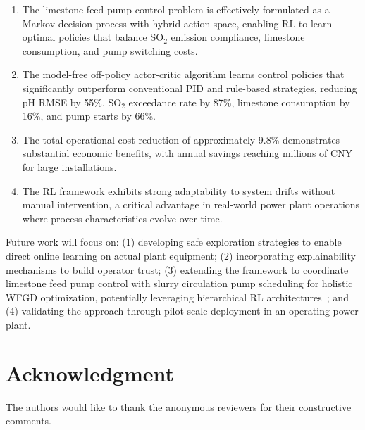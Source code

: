 \documentclass[journal]{IEEEtran}
\begin{document}
\begin{enumerate}
\item The limestone feed pump control problem is effectively formulated as a Markov decision process with hybrid action space, enabling RL to learn optimal policies that balance SO$_2$ emission compliance, limestone consumption, and pump switching costs.

\item The model-free off-policy actor-critic algorithm learns control policies that significantly outperform conventional PID and rule-based strategies, reducing pH RMSE by 55\%, SO$_2$ exceedance rate by 87\%, limestone consumption by 16\%, and pump starts by 66\%.

\item The total operational cost reduction of approximately 9.8\% demonstrates substantial economic benefits, with annual savings reaching millions of CNY for large installations.

\item The RL framework exhibits strong adaptability to system drifts without manual intervention, a critical advantage in real-world power plant operations where process characteristics evolve over time.
\end{enumerate}

Future work will focus on: (1) developing safe exploration strategies to enable direct online learning on actual plant equipment; (2) incorporating explainability mechanisms to build operator trust; (3) extending the framework to coordinate limestone feed pump control with slurry circulation pump scheduling for holistic WFGD optimization, potentially leveraging hierarchical RL architectures~\cite{hierarchical2024}; and (4) validating the approach through pilot-scale deployment in an operating power plant.


\section*{Acknowledgment}
The authors would like to thank the anonymous reviewers for their constructive comments.

\end{document}
